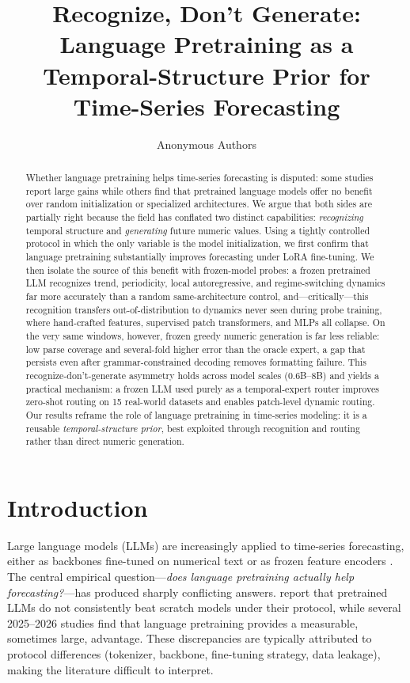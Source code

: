 \documentclass{article}
\title{Recognize, Don't Generate:\\ Language Pretraining as a Temporal-Structure
Prior for Time-Series Forecasting}
\author{Anonymous Authors}
\date{}
\begin{document}
\maketitle

\begin{abstract}
Whether language pretraining helps time-series forecasting is disputed: some
studies report large gains while others find that pretrained language models
offer no benefit over random initialization or specialized architectures.  We
argue that both sides are partially right because the field has conflated two
distinct capabilities: \emph{recognizing} temporal structure and
\emph{generating} future numeric values.  Using a tightly controlled protocol
in which the only variable is the model initialization, we first confirm that
language pretraining substantially improves forecasting under LoRA
fine-tuning.  We then isolate the source of this benefit with frozen-model
probes: a frozen pretrained LLM recognizes trend, periodicity, local
autoregressive, and regime-switching dynamics far more accurately than a random
same-architecture control, and---critically---this recognition transfers
out-of-distribution to dynamics never seen during probe training, where
hand-crafted features, supervised patch transformers, and MLPs all collapse.
On the very same windows, however, frozen greedy numeric generation is far less
reliable: low parse coverage and several-fold higher error than the oracle
expert, a gap that persists even after grammar-constrained decoding removes
formatting failure.  This recognize-don't-generate asymmetry holds across model
scales (0.6B--8B) and yields a practical mechanism: a frozen LLM used purely as
a temporal-expert router improves zero-shot routing on 15 real-world datasets
and enables patch-level dynamic routing.  Our results reframe the role of
language pretraining in time-series modeling: it is a reusable
\emph{temporal-structure prior}, best exploited through recognition and routing
rather than direct numeric generation.
\end{abstract}

\section{Introduction}\label{sec:intro}

Large language models (LLMs) are increasingly applied to time-series
forecasting, either as backbones fine-tuned on numerical text
\citep{gruver2023large,time-llm2023,qwen-time} or as frozen feature
encoders \citep{liu2024pre-training,rasul2024lag}.  The central empirical
question---\emph{does language pretraining actually help forecasting?}---has
produced sharply conflicting answers.  \citet{tan2024are} report that
pretrained LLMs do not consistently beat scratch models under their protocol,
while several 2025--2026 studies \citep{randominit2025,manifold2026} find that
language pretraining provides a measurable, sometimes large, advantage.  These
discrepancies are typically attributed to protocol differences (tokenizer,
backbone, fine-tuning strategy, data leakage), making the literature difficult
to interpret.
\end{document}
